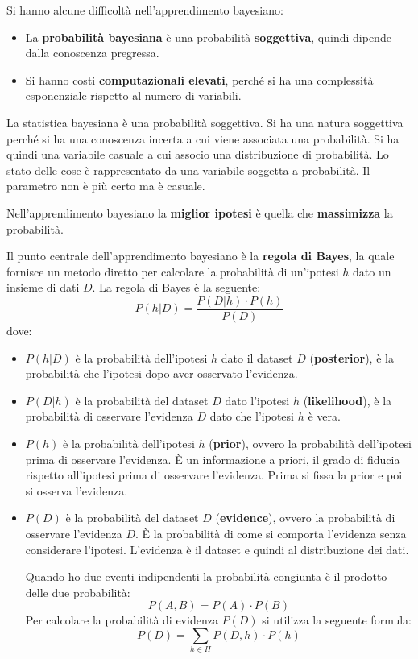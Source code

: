 Si hanno alcune difficoltà nell'apprendimento bayesiano:
\begin{itemize}
    \item La \textbf{probabilità bayesiana} è una probabilità \textbf{soggettiva},
          quindi dipende dalla conoscenza pregressa.
    \item Si hanno costi \textbf{computazionali elevati}, perché si ha una complessità
          esponenziale rispetto al numero di variabili.
\end{itemize}
La statistica bayesiana è una probabilità soggettiva. Si ha una natura soggettiva
perché si ha una conoscenza incerta a cui viene associata una probabilità. Si
ha quindi una variabile casuale a cui associo una distribuzione di probabilità.
Lo stato delle cose è rappresentato da una variabile soggetta a probabilità.
Il parametro non è più certo ma è casuale.
\begin{nota}
    Nell'apprendimento bayesiano la \textbf{miglior ipotesi} è quella che
    \textbf{massimizza} la probabilità.
\end{nota}
Il punto centrale dell'apprendimento bayesiano è la \textbf{regola di Bayes},
la quale fornisce un metodo diretto per calcolare la probabilità di un'ipotesi
$h$ dato un insieme di dati $D$. La regola di Bayes è la seguente:
\begin{equation}
    P(h|D) = \frac{P(D|h) \cdot P(h)}{P(D)}
\end{equation}
dove:
\begin{itemize}
    \item $P(h|D)$ è la probabilità dell'ipotesi $h$ dato il dataset $D$
          (\textbf{posterior}), è la probabilità che l'ipotesi  dopo aver osservato
          l'evidenza.
    \item $P(D|h)$ è la probabilità del dataset $D$ dato l'ipotesi $h$
          (\textbf{likelihood}), è la probabilità di osservare l'evidenza $D$ dato che
          l'ipotesi $h$ è vera.
    \item $P(h)$ è la probabilità dell'ipotesi $h$ (\textbf{prior}), ovvero la
          probabilità dell'ipotesi prima di osservare l'evidenza. È un informazione
          a priori, il grado di fiducia rispetto all'ipotesi prima di osservare
          l'evidenza. Prima si fissa la prior e poi si osserva l'evidenza.
    \item $P(D)$ è la probabilità del dataset $D$ (\textbf{evidence}), ovvero
          la probabilità di osservare l'evidenza $D$. È la probabilità di come si
          comporta l'evidenza senza considerare l'ipotesi. L'evidenza è il dataset e
          quindi al distribuzione dei dati.

          Quando ho due eventi indipendenti la probabilità congiunta è il prodotto
          delle due probabilità:
          \begin{equation}
              P(A, B) = P(A) \cdot P(B)
          \end{equation}
          Per calcolare la probabilità di evidenza $P(D)$ si utilizza la seguente
          formula:
          \begin{equation}
              P(D) = \sum_{h \in H} P(D, h) \cdot P(h)
          \end{equation}
\end{itemize}

